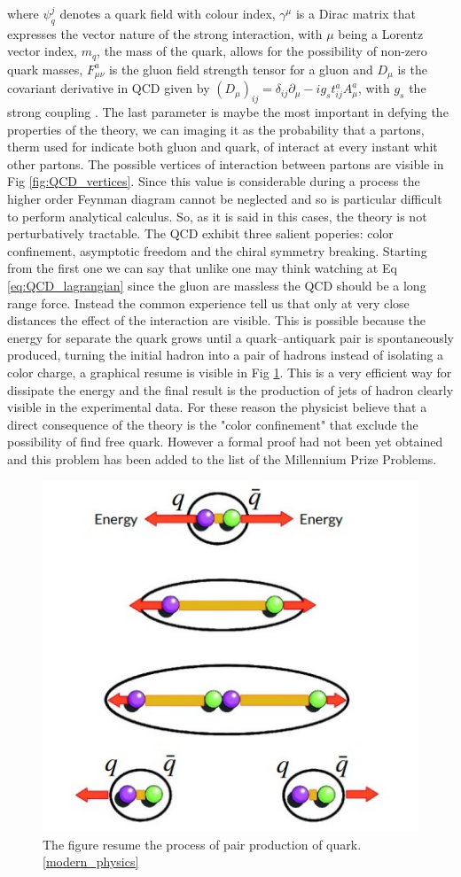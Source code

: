 \documentclass[12pt,a4paper]{book}
\begin{document}
	where $\psi^j_q$ denotes a quark field with colour index, $\gamma^\mu$ is a Dirac matrix that expresses the vector nature of the strong interaction, with $\mu$ being a Lorentz vector index, $m_q$, the mass of the quark, allows for the possibility of non-zero quark masses, $F^a_{\mu \nu}$ is the gluon field strength tensor for a gluon and $D_\mu$ is the covariant derivative in QCD given by $(D_\mu)_{ij}= \delta_{ij} \partial_\mu - ig_s t^a_{ij} A^a_\mu$, with $g_s$ the strong coupling \cite{Skands_2013}.
	The last parameter is maybe the most important in defying the properties of the theory, we can imaging it as the probability that a partons, therm used for indicate both gluon and quark, of interact at every instant whit other partons. The possible vertices of interaction between partons are visible in Fig \ref{fig:QCD_vertices}. Since this value is considerable during a process the higher order Feynman diagram cannot be neglected and so is particular difficult to perform analytical calculus. So, as it is said in this cases, the theory is not perturbatively tractable.  
	The QCD exhibit three salient poperies: color confinement, asymptotic freedom and the chiral symmetry breaking. 
	Starting from the first one we can say that unlike one may think watching at Eq \ref{eq:QCD_lagrangian} since the gluon are massless the QCD should be a long range force. Instead the common experience tell us that only at very close distances the effect of the interaction are visible. This is possible because the energy for separate the quark grows until a quark–antiquark pair is spontaneously produced, turning the initial hadron into a pair of hadrons instead of isolating a color charge, a graphical resume is visible in Fig \ref{fig:quark_confinement}. This is a very efficient way for dissipate the energy and the final result is the production of jets of hadron clearly visible in the experimental data. For these reason the physicist believe that a direct consequence of the theory is the "color confinement" that exclude the possibility of find free quark. However a formal proof had not been yet obtained and this problem has been added to the list of the Millennium Prize Problems. 	
	\begin{figure}		
		\centering
		\includegraphics[width=0.7\linewidth]{pictures/quark_confinement.jpeg}
		\caption{The figure resume the process of pair production of quark. \ref{modern_physics}}
		\label{fig:quark_confinement} 
	\end{figure}
	
\end{document}
